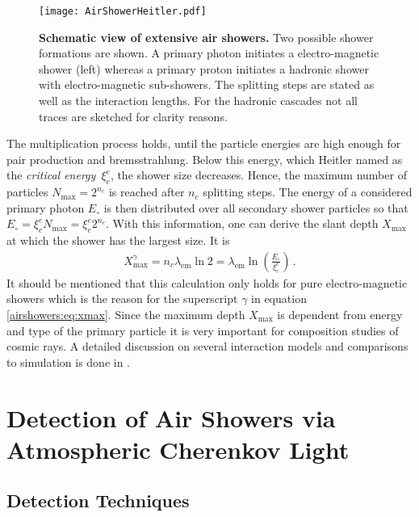 \begin{figure}[h]
	\texttt{[image: AirShowerHeitler.pdf]}
	\caption[Schematic view of extensive air showers]{\textbf{Schematic view of extensive air showers.} \cite{famous:niggemann} Two possible shower formations are shown. A primary photon initiates a electro-magnetic shower (left) whereas a primary proton initiates a hadronic shower with electro-magnetic sub-showers. The splitting steps are stated as well as the interaction lengths. For the hadronic cascades not all traces are sketched for clarity reasons.}	
	\label{airshowers:cascades}
\end{figure}

The multiplication process holds, until the particle energies are high enough for pair production and bremsstrahlung. Below this energy, which Heitler named as the \textit{critical energy}~$\xi_c^e$, the shower size decreases. Hence, the maximum number of particles $N_\text{max} = 2^{n_c}$ is reached after $n_c$ splitting steps. The energy of a considered primary photon $E_\circ$ is then distributed over all secondary shower particles so that $E_\circ = \xi_c^e N_\text{max} = \xi_c^e 2^{n_c}$. With this information, one can derive the slant depth $X_\text{max}$ at which the shower has the largest size. It is
\begin{align}
	X_\text{max}^\gamma = n_c\lambda_\text{em}\ln{2} = \lambda_\text{em}\ln{\left(\frac{E_\circ}{\xi_c^e}\right)}\,.
	\label{airshowers:eq:xmax}
\end{align}
It should be mentioned that this calculation only holds for pure electro-magnetic showers which is the reason for the superscript $\gamma$ in equation \eqref{airshowers:eq:xmax}. \cite{airshowers:heitlermodel}
Since the maximum depth $X_\text{max}$ is dependent from energy and type of the primary particle it is very important for composition studies of cosmic rays. A detailed discussion on several interaction models and comparisons to simulation is done in \cite{airshowers:heitlermodel}.

\section{Detection of Air Showers via Atmospheric Cherenkov Light}\label{sec:cherenkov}

\subsection{Detection Techniques}

